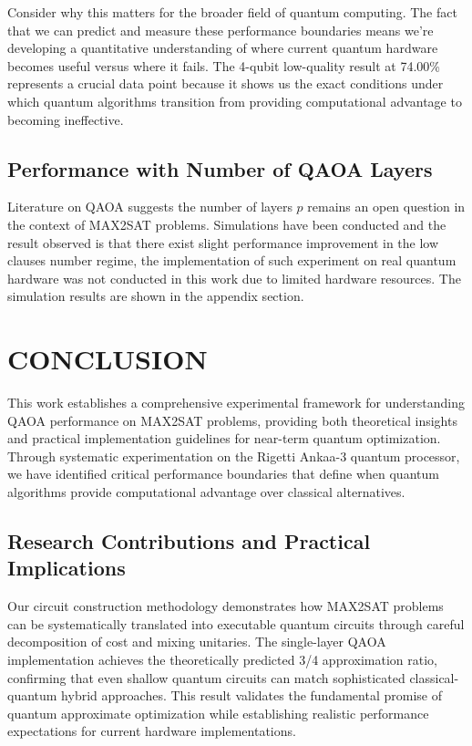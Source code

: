 \documentclass[%
 reprint,
 amsmath,amssymb,
 aps,
]{revtex4-2}
\begin{document}
Consider why this matters for the broader field of quantum computing. The fact that we can predict and measure these performance boundaries means we're developing a quantitative understanding of where current quantum hardware becomes useful versus where it fails. The 4-qubit low-quality result at 74.00\% represents a crucial data point because it shows us the exact conditions under which quantum algorithms transition from providing computational advantage to becoming ineffective.

\subsection{Performance with Number of QAOA Layers}
Literature on QAOA suggests the number of layers $p$ remains an open question in the context of MAX2SAT problems. Simulations have been conducted and the result observed is that there exist slight performance improvement in the low clauses number regime, the implementation of such experiment on real quantum hardware was not conducted in this work due to limited hardware resources. The simulation results are shown in the appendix section.


\section{CONCLUSION}

This work establishes a comprehensive experimental framework for understanding QAOA performance on MAX2SAT problems, providing both theoretical insights and practical implementation guidelines for near-term quantum optimization. Through systematic experimentation on the Rigetti Ankaa-3 quantum processor, we have identified critical performance boundaries that define when quantum algorithms provide computational advantage over classical alternatives.

\subsection{Research Contributions and Practical Implications}

Our circuit construction methodology demonstrates how MAX2SAT problems can be systematically translated into executable quantum circuits through careful decomposition of cost and mixing unitaries. The single-layer QAOA implementation achieves the theoretically predicted 3/4 approximation ratio, confirming that even shallow quantum circuits can match sophisticated classical-quantum hybrid approaches. This result validates the fundamental promise of quantum approximate optimization while establishing realistic performance expectations for current hardware implementations.
\end{document}
